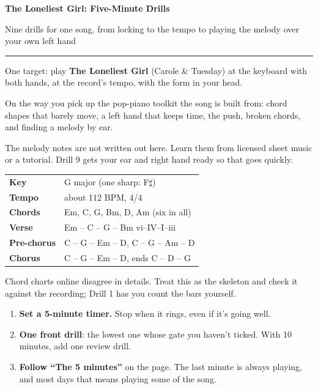 \documentclass[10pt]{article}
\newcommand{\sh}{$\sharp$}
\newcommand{\sect}[1]{\par\vspace{5pt}{\large\bfseries #1}\par\vspace{2pt}}
\begin{document}
{\fontsize{26}{28}\selectfont\bfseries The Loneliest Girl: Five-Minute Drills}\par\vspace{2pt}
{\large Nine drills for one song, from locking to the tempo to playing the melody over your own left hand}\par
\vspace{2pt}\noindent\rule{\textwidth}{0.8pt}\par\vspace{2pt}

\begin{minipage}[t]{0.485\textwidth}
\sect{What this set is for}
One target: play \textbf{The Loneliest Girl} (Carole \& Tuesday) at the keyboard with both hands, at the record's tempo, with the form in your head.

On the way you pick up the pop-piano toolkit the song is built from: chord shapes that barely move, a left hand that keeps time, the push, broken chords, and finding a melody by ear.

The melody notes are not written out here. Learn them from licensed sheet music or a tutorial. Drill 9 gets your ear and right hand ready so that goes quickly.

\sect{The song at a glance}
\small
\renewcommand{\arraystretch}{1.15}
\begin{tabularx}{\linewidth}{@{}>{\bfseries}l X@{}}
Key & G major (one sharp: F\sh)\\
Tempo & about 112 BPM, 4/4\\
Chords & Em, C, G, Bm, D, Am (six in all)\\
Verse & Em -- C -- G -- Bm \hfill vi--IV--I--iii\\
Pre-chorus & C -- G -- Em -- D, C -- G -- Am -- D\\
Chorus & C -- G -- Em -- D, ends C -- D -- G\\
\end{tabularx}\par
\footnotesize Chord charts online disagree in details. Treat this as the skeleton and check it against the recording; Drill 1 has you count the bars yourself.\normalsize

\sect{The daily routine}
\begin{enumerate}
\item \textbf{Set a 5-minute timer.} Stop when it rings, even if it's going well.
\item \textbf{One front drill}: the lowest one whose gate you haven't ticked. With 10 minutes, add one review drill.
\item \textbf{Follow ``The 5 minutes''} on the page. The last minute is always playing, and most days that means playing some of the song.
\end{enumerate}


\end{minipage}
\end{document}
